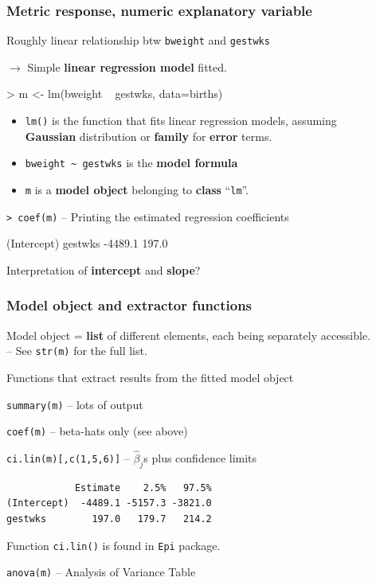 \documentclass[12pt,dvipsnames,t,handout%
,aspectratio=169%
]{beamer}
\begin{document}
\begin{frame}[fragile]\frametitle{Metric response, numeric explanatory variable}

Roughly linear relationship btw \texttt{bweight}
and \texttt{gestwks} 

$\to$ 
 Simple {\bf linear regression model} fitted.
\begin{semiverbatim}
> m <- lm(bweight ~ gestwks, data=births)
\end{semiverbatim}
\begin{itemize}
\item \texttt{lm()} is the function that fits linear regression models,
assuming \\ {\bf Gaussian} distribution or \textbf{family} for {\bf error} terms.
\medskip
\item \verb+bweight ~ gestwks+ is the {\bf model formula}
\medskip
\item \texttt{m} is a {\bf model object} belonging to {\bf class} ``{\tt lm}''.
\end{itemize}

\medskip

\verb|> coef(m)| -- Printing the estimated regression coefficients
{\small
\begin{semiverbatim}
(Intercept)     gestwks 
    -4489.1       197.0 
\end{semiverbatim}
}
Interpretation of {\bf intercept} and {\bf slope}?
\vfill
\end{frame}


\begin{frame}[fragile]\frametitle{Model object and extractor functions}

Model object = {\bf list} of different elements, each being
separately accessible. \\ -- See \texttt{str(m)} for the full list.

\medskip
Functions that extract results from the fitted model object

\bi
\item
 \verb|summary(m)| -- lots of output
\medskip
\item
\verb|coef(m)| -- beta-hats only (see above)
\medskip
\item
\verb|ci.lin(m)[,c(1,5,6)]| -- $\widehat\beta_j$s plus confidence limits 
{\small
\begin{verbatim}
            Estimate    2.5%   97.5%
(Intercept)  -4489.1 -5157.3 -3821.0
gestwks        197.0   179.7   214.2
\end{verbatim}
}
Function \texttt{ci.lin()} is found in {\tt Epi} package.
\medskip
\item
\verb|anova(m)| -- Analysis of Variance Table

\ei
\end{frame}
\end{document}
